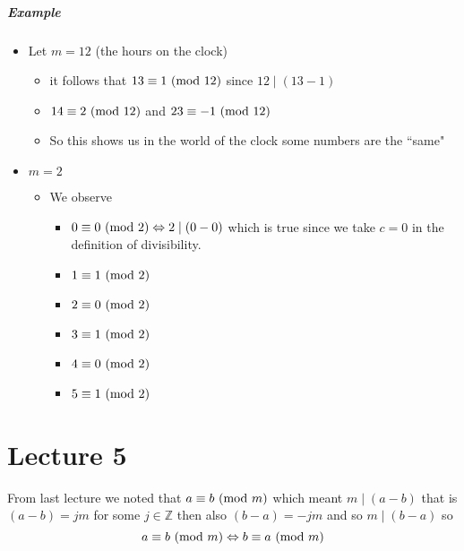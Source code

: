 \documentclass[11pt]{book}
\begin{document}
\paragraph{Example} 
\begin{itemize}
    \item Let $m = 12$ (the hours on the clock)
        \begin{itemize}
            \item it follows that $13 \equiv 1 \ (\mathrm{mod}\ 12) $ since $12 \mid \left( 13  - 1 \right) $ 
            \item $14 \equiv 2 \ (\mathrm{mod}\ 12) $ and $23 \equiv -1 \ (\mathrm{mod}\ 12) $ 
            \item So this shows us in the world of the clock some numbers are the ``same"
        \end{itemize}
    \item $m = 2$ 
        \begin{itemize}
            \item We observe 
                \begin{itemize}
                    \item $0 \equiv 0 \ (\mathrm{mod}\ 2) \Leftrightarrow 2 \mid \left( 0  - 0 \right) $ which is true since we take $c = 0$ in the definition of divisibility.
                    \item $1 \equiv 1 \ (\mathrm{mod}\ 2) $ 
                    \item $2 \equiv 0 \ (\mathrm{mod}\ 2) $ 
                    \item $3 \equiv 1 \ (\mathrm{mod}\ 2) $ 
                    \item $4 \equiv 0 \ (\mathrm{mod}\ 2) $ 
                    \item $5 \equiv 1 \ (\mathrm{mod}\ 2) $ 
                \end{itemize}
        \end{itemize}
\end{itemize}



\chapter{Lecture 5}%
\label{chp:lecture_5}

\begin{remark}
    From last lecture we noted that $a \equiv b \ (\mathrm{mod}\ m) $ which meant $m 
    \mid \left( a - b \right) $ that is $\left( a - b \right) = jm$ for some $j\in \mathbb{Z} $ then also $\left( b - a \right) =  - jm$ and so $m \mid \left( b - a \right) $   so 
    \[
    a \equiv b \ (\mathrm{mod}\ m) \Leftrightarrow b \equiv a \ (\mathrm{mod}\ m) 
    \]
\end{remark}
\end{document}
